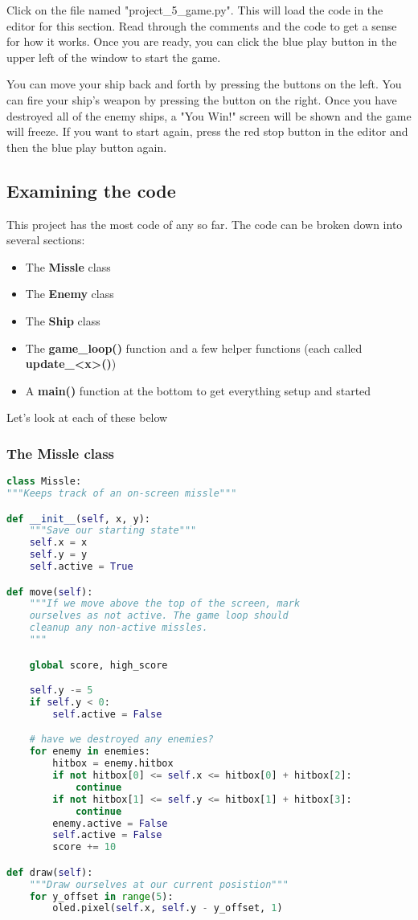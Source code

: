 Click on the file named "project\_5\_game.py". This will load the code in the editor for this section. Read through the comments
and the code to get a sense for how it works. Once you are ready, you can click the blue play button in the upper left of the window
to start the game.

You can move your ship back and forth by pressing the buttons on the left. You can fire your ship's weapon by pressing the
button on the right. Once you have destroyed all of the enemy ships, a "You Win!" screen will be shown and the game will freeze.
If you want to start again, press the red stop button in the editor and then the blue play button again.

\subsection{Examining the code}

This project has the most code of any so far. The code can be broken down into several sections:
\begin{itemize}
    \item The \textbf{Missle} class
    \item The \textbf{Enemy} class
    \item The \textbf{Ship} class
    \item The \textbf{game\_loop()} function and a few helper functions (each called \textbf{update\_<x>()})
    \item A \textbf{main()} function at the bottom to get everything setup and started
\end{itemize}

Let's look at each of these below

\subsubsection{The Missle class}
\begin{lstlisting}[language=Python,caption=The Missle class]
class Missle:
"""Keeps track of an on-screen missle"""

def __init__(self, x, y):
    """Save our starting state"""
    self.x = x
    self.y = y
    self.active = True

def move(self):
    """If we move above the top of the screen, mark
    ourselves as not active. The game loop should
    cleanup any non-active missles.
    """

    global score, high_score

    self.y -= 5
    if self.y < 0:
        self.active = False

    # have we destroyed any enemies?
    for enemy in enemies:
        hitbox = enemy.hitbox
        if not hitbox[0] <= self.x <= hitbox[0] + hitbox[2]:
            continue
        if not hitbox[1] <= self.y <= hitbox[1] + hitbox[3]:
            continue
        enemy.active = False
        self.active = False
        score += 10

def draw(self):
    """Draw ourselves at our current posistion"""
    for y_offset in range(5):
        oled.pixel(self.x, self.y - y_offset, 1)
\end{lstlisting}

